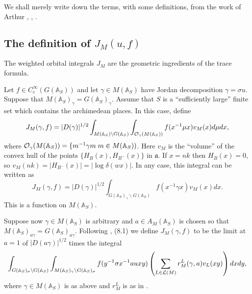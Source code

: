 \documentclass[12pt,letterpaper]{book}
\theoremstyle{plain}
\theoremstyle{definition}
\theoremstyle{remark}
\theoremstyle{remark}
\begin{document}
We shall merely write down the terms, with some definitions, from the
work of Arthur \cite{A2}, \cite{A3}, \cite{A7}.

\subsection{The definition of \texorpdfstring{$J_M(u,f)$}{J\_M(u,f)}}

The weighted orbital integrals $J_M$ are the geometric ingredients of the trace formula.


Let $f\in C_c^\infty (G({\mathbb {A}}_S))$ and let
$\gamma \in M({\mathbb {A}}_S)$ have Jordan decomposition
$\gamma =\sigma u$. Suppose that
$M({\mathbb {A}}_S)_\gamma =G({\mathbb {A}}_S)_\gamma $.
Assume that $S$ is a ``sufficiently large'' finite set which contains
the archimedean places. In this case, define
\begin{equation}
J_M(\gamma ,f)=|D(\gamma )|^{1/2}
\int_{M({\mathbb {A}}_S)\backslash G({\mathbb {A}}_S)}
\int_{{\cal O}_\gamma (M({\mathbb {A}}_S))}f(x^{-1}\mu x)v_M(x)d\mu dx,
\end{equation}
where ${\cal O}_\gamma (M({\mathbb {A}}_S))
=\{m^{-1}\gamma m\;m\in M({\mathbb {A}}_S))$.
Here $v_M$ is the ``volume'' of the convex hull of the points
$\{H_B(x),H_{B^{-}}(x)\}$ in ${\mathfrak a}$. If $x=nk$ then
$H_B(x)=0$, so $v_M(nk)=|H_{B^{-}}(x)|=|\log\delta (wx)|$.
In any case, this integral can be written as
\[
J_M(\gamma ,f)=|D(\gamma )|^{1/2}
\int_{G({\mathbb {A}}_S)_\gamma \backslash G({\mathbb{A}}_S)}
f(x^{-1}\gamma x)v_M(x)dx.
\]
This is a function on $M({\mathbb {A}}_S)$.

Suppose now $\gamma \in M({\mathbb {A}}_S)$ is arbitrary and $a\in
A_M({\mathbb {A}}_S)$ is chosen so that
$M({\mathbb {A}}_S)_{a\gamma }=G({\mathbb {A}}_S)_{a\gamma }$.
Following \cite{A7}, (8.1)
we define $J_M(\gamma ,f)$ to be the limit at $a=1$
of $|D(a\gamma )|^{1/2}$ times the integral
\begin{equation}
\int_{G({\mathbb {A}}_S)_\sigma \backslash G({\mathbb {A}}_S)}
\int_{M({\mathbb {A}}_S)_\gamma \backslash G({\mathbb {A}}_S)_\sigma }
f(y^{-1}\sigma x^{-1}a u xy) \left( \sum_{L\in {\cal L}(M)}r_M^L(\gamma
,a)v_L(xy)\right) dxdy,
\end{equation}
where $\gamma\in M({\mathbb A}_S)$ is as above and $r_M^L$ is as in \cite{A7}.
\end{document}

